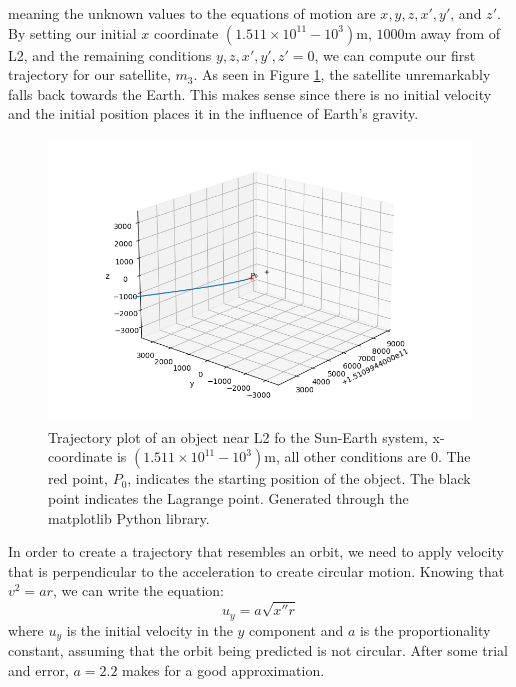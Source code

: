 meaning the unknown values to the equations of motion are $x, y, z, x', y'$, and $z'$.
By setting our initial $x$ coordinate $(1.511\times10^{11} - 10^3)\si{\metre}$, $1000\si{\metre}$ away from of L2, and the remaining conditions $y, z, x', y', z' = 0$, we can compute our first trajectory for our satellite, $m_3$.
As seen in Figure \ref{fig:3dplot1}, the satellite unremarkably falls back towards the Earth.
This makes sense since there is no initial velocity and the initial position places it in the influence of Earth's gravity.
\newpage
\begin{samepage}
\begin{figure}[ht!]
	\centering
	\includegraphics[scale=0.52]{3dplot1.png}
	\caption{Trajectory plot of an object near L2 fo the Sun-Earth system, x-coordinate is $(1.511\times10^{11} - 10^3)\si{\metre}$, all other conditions are 0.
		The red point, $P_0$, indicates the starting position of the object.
		The black point indicates the Lagrange point.
		Generated through the matplotlib Python library.
	}
	\label{fig:3dplot1}
\end{figure}
In order to create a trajectory that resembles an orbit, we need to apply velocity that is perpendicular to the acceleration to create circular motion.
Knowing that $v^2 = ar$, we can write the equation:
\begin{equation*}
	u_y = a\sqrt{x''r}
\end{equation*}
where $u_y$ is the initial velocity in the $y$ component and $a$ is the proportionality constant, assuming that the orbit being predicted is not circular.
After some trial and error, $a = 2.2$ makes for a good approximation.
\begin{figure}[H]
	\centering

\end{figure}
\end{samepage}
